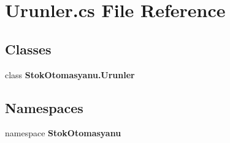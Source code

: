 \section{Urunler.\+cs File Reference}
\label{_urunler_8cs}
\subsection*{Classes}
\begin{DoxyCompactItemize}
\item 
class \textbf{ Stok\+Otomasyanu.\+Urunler}
\end{DoxyCompactItemize}
\subsection*{Namespaces}
\begin{DoxyCompactItemize}
\item 
namespace \textbf{ Stok\+Otomasyanu}
\end{DoxyCompactItemize}
